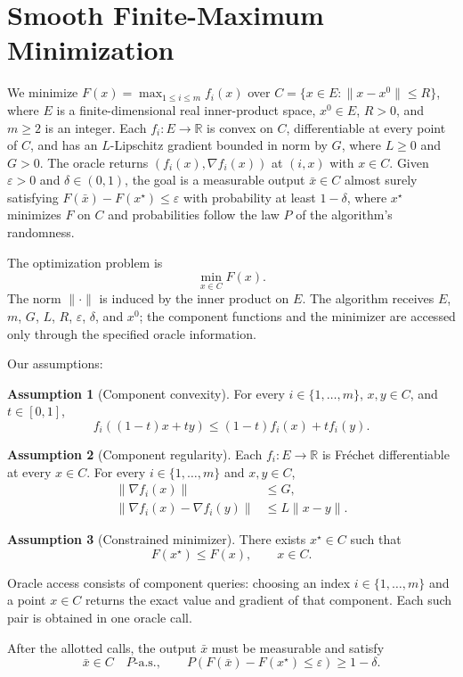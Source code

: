 \documentclass[10pt]{article}
\theoremstyle{definition}
\newtheorem{assumption}{Assumption}
\begin{document}
\section*{Smooth Finite-Maximum Minimization}
We minimize $F(x)=\max_{1\leq i\leq m} f_i(x)$ over $C=\{x\in E:\|x-x^0\|\leq R\}$, where $E$ is a finite-dimensional real inner-product space, $x^0\in E$, $R>0$, and $m\geq2$ is an integer. Each $f_i:E\to\mathbb{R}$ is convex on $C$, differentiable at every point of $C$, and has an $L$-Lipschitz gradient bounded in norm by $G$, where $L\geq0$ and $G>0$. The oracle returns $(f_i(x),\nabla f_i(x))$ at $(i,x)$ with $x\in C$. Given $\varepsilon>0$ and $\delta\in(0,1)$, the goal is a measurable output $\bar{x}\in C$ almost surely satisfying $F(\bar{x})-F(x^\star)\leq\varepsilon$ with probability at least $1-\delta$, where $x^\star$ minimizes $F$ on $C$ and probabilities follow the law $P$ of the algorithm's randomness.

The optimization problem is
\[
\min_{x\in C} F(x).
\]
The norm $\|\cdot\|$ is induced by the inner product on $E$. The algorithm receives $E$, $m$, $G$, $L$, $R$, $\varepsilon$, $\delta$, and $x^0$; the component functions and the minimizer are accessed only through the specified oracle information.

Our assumptions:
\begin{assumption}[Component convexity]
For every $i\in\{1,\ldots,m\}$, $x,y\in C$, and $t\in[0,1]$,
\[
f_i((1-t)x+ty)\leq (1-t)f_i(x)+t f_i(y).
\]
\end{assumption}

\begin{assumption}[Component regularity]
Each $f_i:E\to\mathbb{R}$ is Fr\'echet differentiable at every $x\in C$. For every $i\in\{1,\ldots,m\}$ and $x,y\in C$,
\[
\begin{aligned}
\|\nabla f_i(x)\|&\leq G,\\
\|\nabla f_i(x)-\nabla f_i(y)\|&\leq L\|x-y\|.
\end{aligned}
\]
\end{assumption}

\begin{assumption}[Constrained minimizer]
There exists $x^\star\in C$ such that
\[
F(x^\star)\leq F(x),\qquad x\in C.
\]
\end{assumption}

Oracle access consists of component queries: choosing an index $i\in\{1,\ldots,m\}$ and a point $x\in C$ returns the exact value and gradient of that component. Each such pair is obtained in one oracle call.

After the allotted calls, the output $\bar{x}$ must be measurable and satisfy
\[
\bar{x}\in C\quad P\text{-a.s.},
\qquad
P\!\left(F(\bar{x})-F(x^\star)\leq\varepsilon\right)
\geq 1-\delta.
\]
\end{document}
